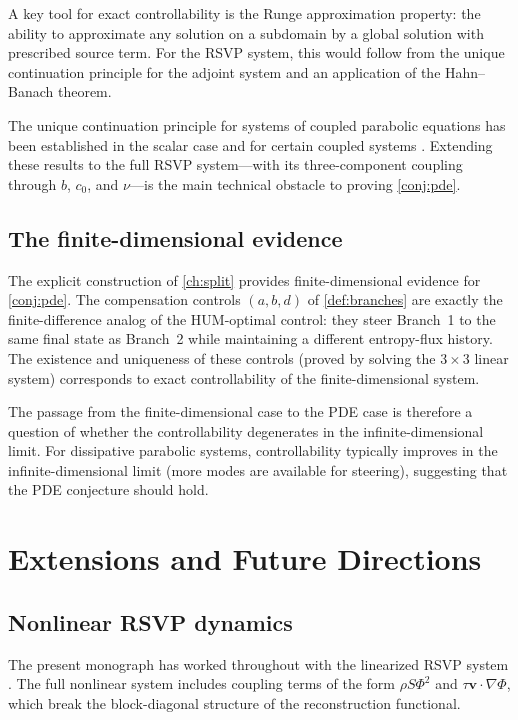 \documentclass[12pt, oneside]{memoir}
\newcommand{\bv}{\mathbf{v}}
\begin{document}
A key tool for exact controllability is the Runge approximation property: the ability to
approximate any solution on a subdomain by a global solution with prescribed source term.
For the RSVP system, this would follow from the unique continuation principle for the
adjoint system and an application of the Hahn--Banach theorem.

The unique continuation principle for systems of coupled parabolic equations has been
established in the scalar case \cite{fabre1995} and for certain coupled systems
\cite{gonzalez2006}.  Extending these results to the full RSVP system---with its
three-component coupling through $b$, $c_0$, and $\nu$---is the main technical obstacle
to proving \cref{conj:pde}.

\section{The finite-dimensional evidence}

The explicit construction of \cref{ch:split} provides finite-dimensional evidence for
\cref{conj:pde}.  The compensation controls $(a, b, d)$ of \cref{def:branches} are
exactly the finite-difference analog of the HUM-optimal control: they steer Branch~1 to
the same final state as Branch~2 while maintaining a different entropy-flux history.  The
existence and uniqueness of these controls (proved by solving the $3 \times 3$ linear
system) corresponds to exact controllability of the finite-dimensional system.

The passage from the finite-dimensional case to the PDE case is therefore a question of
whether the controllability degenerates in the infinite-dimensional limit.  For
dissipative parabolic systems, controllability typically improves in the
infinite-dimensional limit (more modes are available for steering), suggesting that the
PDE conjecture should hold.

\chapter{Extensions and Future Directions}
\label{ch:extensions}

\section{Nonlinear RSVP dynamics}

The present monograph has worked throughout with the linearized RSVP system
.  The full nonlinear system includes coupling terms of
the form $\rho S \Phi^2$ and $\tau \bv \cdot \nabla \Phi$, which break the block-diagonal
structure of the reconstruction functional.
\end{document}

